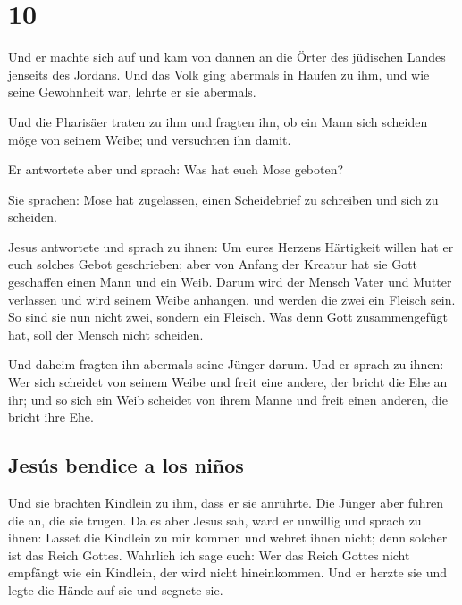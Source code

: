 \hypertarget{section-9}{%
\section{10}\label{section-9}}

 Und er machte sich auf und kam von dannen an die Örter
des jüdischen Landes jenseits des Jordans. Und das Volk ging abermals in
Haufen zu ihm, und wie seine Gewohnheit war, lehrte er sie abermals.

 Und die Pharisäer traten zu ihm und fragten ihn, ob ein
Mann sich scheiden möge von seinem Weibe; und versuchten ihn damit.

 Er antwortete aber und sprach: Was hat euch Mose geboten?

 Sie sprachen: Mose hat zugelassen, einen Scheidebrief zu
schreiben und sich zu scheiden.

 Jesus antwortete und sprach zu ihnen: Um eures Herzens
Härtigkeit willen hat er euch solches Gebot geschrieben; 
aber von Anfang der Kreatur hat sie Gott geschaffen einen Mann und ein
Weib.  Darum wird der Mensch Vater und Mutter verlassen
und wird seinem Weibe anhangen,  und werden die zwei ein
Fleisch sein. So sind sie nun nicht zwei, sondern ein Fleisch.
 Was denn Gott zusammengefügt hat, soll der Mensch nicht
scheiden.

 Und daheim fragten ihn abermals seine Jünger darum.
 Und er sprach zu ihnen: Wer sich scheidet von seinem
Weibe und freit eine andere, der bricht die Ehe an ihr; 
und so sich ein Weib scheidet von ihrem Manne und freit einen anderen,
die bricht ihre Ehe.

\hypertarget{jesuxfas-bendice-a-los-niuxf1os}{%
\subsection{Jesús bendice a los
niños}\label{jesuxfas-bendice-a-los-niuxf1os}}

 Und sie brachten Kindlein zu ihm, dass er sie anrührte.
Die Jünger aber fuhren die an, die sie trugen.  Da es
aber Jesus sah, ward er unwillig und sprach zu ihnen: Lasset die
Kindlein zu mir kommen und wehret ihnen nicht; denn solcher ist das
Reich Gottes.  Wahrlich ich sage euch: Wer das Reich
Gottes nicht empfängt wie ein Kindlein, der wird nicht hineinkommen.
 Und er herzte sie und legte die Hände auf sie und
segnete sie.

